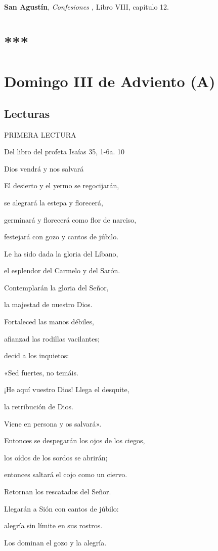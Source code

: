 \begin{body}
\begin{body}
\textbf{San Agustín}, \emph{Confesiones ,} Libro VIII, capítulo 12.

\chapter{***}
\chapter{Domingo III de Adviento (A)}

\section{Lecturas}

PRIMERA LECTURA

Del libro del profeta Isaías 35, 1-6a. 10

Dios vendrá y nos salvará

El desierto y el yermo se regocijarán,

se alegrará la estepa y florecerá,

germinará y florecerá como flor de narciso,

festejará con gozo y cantos de júbilo.

Le ha sido dada la gloria del Líbano,

el esplendor del Carmelo y del Sarón.

Contemplarán la gloria del Señor,

la majestad de nuestro Dios.

Fortaleced las manos débiles,

afianzad las rodillas vacilantes;

decid a los inquietos:

«Sed fuertes, no temáis.

¡He aquí vuestro Dios! Llega el desquite,

la retribución de Dios.

Viene en persona y os salvará».

Entonces se despegarán los ojos de los ciegos,

los oídos de los sordos se abrirán;

entonces saltará el cojo como un ciervo.

Retornan los rescatados del Señor.

Llegarán a Sión con cantos de júbilo:

alegría sin límite en sus rostros.

Los dominan el gozo y la alegría.


\end{body}
\end{body}

